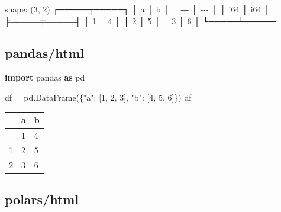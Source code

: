 \documentclass[
  a4paper,
  jafontscale=0.92,
  hanging_punctuation,
  head_space=24.8mm,
  foot_space=24.8mm]{jlreq}
\newenvironment{Shaded}{}{}
\newcommand{\DecValTok}[1]{\textcolor[rgb]{0.25,0.63,0.44}{#1}}
\newcommand{\ImportTok}[1]{\textcolor[rgb]{0.00,0.50,0.00}{\textbf{#1}}}
\newcommand{\NormalTok}[1]{#1}
\newcommand{\OperatorTok}[1]{\textcolor[rgb]{0.40,0.40,0.40}{#1}}
\newcommand{\StringTok}[1]{\textcolor[rgb]{0.25,0.44,0.63}{#1}}
\begin{document}
\vspace{-0.5\baselineskip}


\begin{Shaded}
\begin{Highlighting}[]
\NormalTok{shape: (3, 2)}
\NormalTok{┌─────┬─────┐}
\NormalTok{│ a   │ b   │}
\NormalTok{│ {-}{-}{-} │ {-}{-}{-} │}
\NormalTok{│ i64 │ i64 │}
\NormalTok{╞═════╪═════╡}
\NormalTok{│ 1   │ 4   │}
\NormalTok{│ 2   │ 5   │}
\NormalTok{│ 3   │ 6   │}
\NormalTok{└─────┴─────┘}
\end{Highlighting}
\end{Shaded}

\subsection{pandas/html}\label{pandashtml}


\begin{Shaded}
\begin{Highlighting}[]
\ImportTok{import}\NormalTok{ pandas }\ImportTok{as}\NormalTok{ pd}

\NormalTok{df }\OperatorTok{=}\NormalTok{ pd.DataFrame(\{}\StringTok{"a"}\NormalTok{: [}\DecValTok{1}\NormalTok{, }\DecValTok{2}\NormalTok{, }\DecValTok{3}\NormalTok{], }\StringTok{"b"}\NormalTok{: [}\DecValTok{4}\NormalTok{, }\DecValTok{5}\NormalTok{, }\DecValTok{6}\NormalTok{]\})}
\NormalTok{df}
\end{Highlighting}
\end{Shaded}

\begin{longtable}[]{@{}lll@{}}
\toprule\noalign{}
& a & b \\
\midrule\noalign{}
\endhead
\bottomrule\noalign{}
\endlastfoot
0 & 1 & 4 \\
1 & 2 & 5 \\
2 & 3 & 6 \\
\end{longtable}

\subsection{polars/html}\label{polarshtml}
\end{document}
